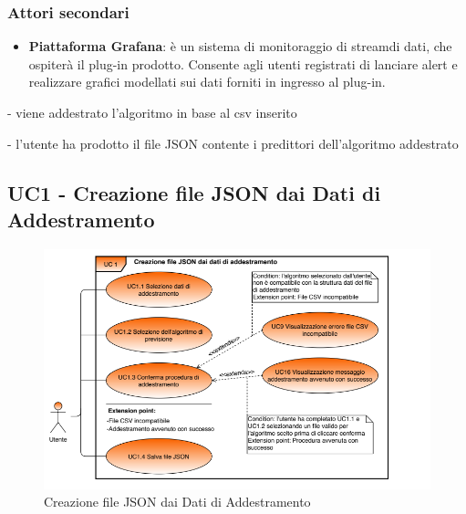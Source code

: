 	\subsubsection{Attori secondari}
	\begin{itemize}
		\item\textbf{Piattaforma Grafana}: è un sistema di monitoraggio di stream\glo di dati, che ospiterà il plug-in prodotto. Consente agli utenti registrati di lanciare alert e realizzare grafici modellati sui dati forniti in ingresso al plug-in.
	\end{itemize}


- viene addestrato l'algoritmo in base al csv inserito

- l'utente ha prodotto il file JSON contente i predittori dell'algoritmo addestrato

	\label{par:UC1}
	\subsection{UC1 - Creazione file JSON dai Dati di Addestramento}

	\begin{figure}[H]
		\centering
		\includegraphics[scale=0.70]{../Analisi_dei_requisiti/img/Diagrammi_UML/UC1_tool_di_addestramento.png}
		\caption{Creazione file JSON dai Dati di Addestramento}
	\end{figure}	


